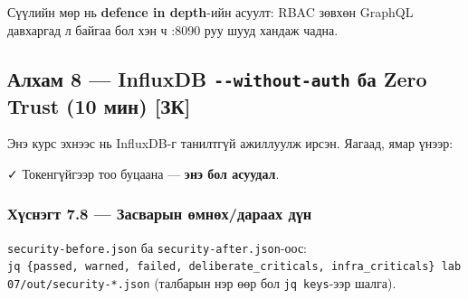 Сүүлийн мөр нь \textbf{defence in depth}-ийн асуулт: RBAC зөвхөн GraphQL давхаргад л байгаа бол хэн ч :8090 руу шууд хандаж чадна.

\hypertarget{ux430ux43bux445ux430ux43c-8-influxdb---without-auth-ux431ux430-zero-trust-10-ux43cux438ux43d-ux437ux43a}{%
\subsection{\texorpdfstring{Алхам 8 --- InfluxDB \texttt{-\/-without-auth} ба Zero Trust (10 мин) {[}ЗК{]}}{Алхам 8 --- InfluxDB -\/-without-auth ба Zero Trust (10 мин) {[}ЗК{]}}}\label{ux430ux43bux445ux430ux43c-8-influxdb---without-auth-ux431ux430-zero-trust-10-ux43cux438ux43d-ux437ux43a}}

Энэ курс эхнээс нь InfluxDB-г танилтгүй ажиллуулж ирсэн. Яагаад, ямар үнээр:

\begin{Shaded}
\begin{Highlighting}[]
 \KeywordTok{\textbackslash{}}
    \KeywordTok{|} 
\end{Highlighting}
\end{Shaded}

✓ Токенгүйгээр тоо буцаана --- \textbf{энэ бол асуудал}.

\hypertarget{ux445ux4afux441ux43dux44dux433ux442-7.8-ux437ux430ux441ux432ux430ux440ux44bux43d-ux4e9ux43cux43dux4e9ux445ux434ux430ux440ux430ux430ux445-ux434ux4afux43d}{%
\subsubsection{Хүснэгт 7.8 --- Засварын өмнөх/дараах дүн}\label{ux445ux4afux441ux43dux44dux433ux442-7.8-ux437ux430ux441ux432ux430ux440ux44bux43d-ux4e9ux43cux43dux4e9ux445ux434ux430ux440ux430ux430ux445-ux434ux4afux43d}}

\texttt{security-before.\allowbreak{}json} ба \texttt{security-after.\allowbreak{}json}-оос: \texttt{jq\ \textquotesingle{}\{passed,\ warned,\ failed,\ deliberate\_criticals,\ infra\_criticals\}\textquotesingle{}\ lab07/out/security-*.json} (талбарын нэр өөр бол \texttt{jq\ \textquotesingle{}keys\textquotesingle{}}-ээр шалга).

